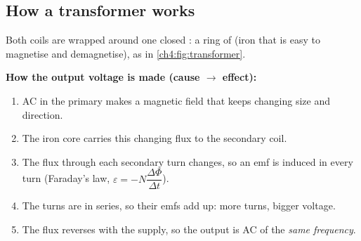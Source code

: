 \subsection{How a transformer works}

Both coils are wrapped around one closed : a ring of  (iron that
is easy to magnetise and demagnetise), as in \cref{ch4:fig:transformer}.

\textbf{How the output voltage is made (cause $\to$ effect):}
\begin{enumerate}
  \item AC in the primary makes a magnetic field that keeps changing size and direction.
  \item The iron core carries this changing flux to the secondary coil.
  \item The flux through each secondary turn changes, so an emf is induced in every turn
        (Faraday's law, $\varepsilon = -N\dfrac{\Delta\Phi}{\Delta t}$).
  \item The turns are in series, so their emfs add up: more turns, bigger voltage.
  \item The flux reverses with the supply, so the output is AC of the \emph{same frequency}.
\end{enumerate}

